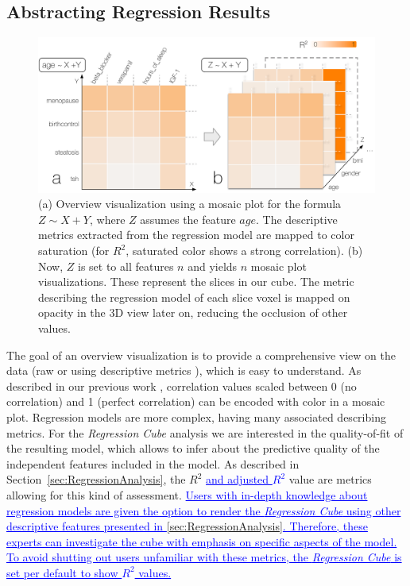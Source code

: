 \documentclass[journal]{style/vgtc} 			          %
\newcommand{\add}[1]{\textcolor{blue}{\uline{#1}}}
\begin{document}
\subsection{Abstracting Regression Results}
\begin{figure}[htb]
 \centering
 \includegraphics[width=1.0\linewidth]{figures/cube}
 \caption{
 (a) Overview visualization using a mosaic plot for the formula $Z \sim X + Y$, where $Z$ assumes the feature $age$.
 The descriptive metrics extracted from the regression model are mapped to color saturation (for $R^2$, saturated color shows a strong correlation).
 (b) Now, $Z$ is set to all features $n$ and yields $n$ mosaic plot visualizations.
 These represent the slices in our cube.
 The metric describing the regression model of each slice voxel is mapped on opacity in the 3D view later on, reducing the occlusion of other values.
 }
  \label{fig:Cube}
\end{figure}
\noindent The goal of an overview visualization is to provide a comprehensive view on the data (raw or using descriptive metrics \cite{Bertini}), which is easy to understand.
As described in our previous work \cite{Klemm2014VIS}, correlation values scaled between 0 (no correlation) and 1 (perfect correlation) can be encoded with color in a mosaic plot.
Regression models are more complex, having many associated describing metrics.
For the \emph{Regression Cube} analysis we are interested in the quality-of-fit of the resulting model, which allows to infer about the predictive quality of the independent features included in the model.
As described in Section~\ref{sec:RegressionAnalysis}, the $R^2$ \add{and adjusted $R^2$} value are metrics allowing for this kind of assessment.
\add{
Users with in-depth knowledge about regression models are given the option to render the \emph{Regression Cube} using other descriptive features presented in \ref{sec:RegressionAnalysis}.
Therefore, these experts can investigate the cube with emphasis on specific aspects of the model.
To avoid shutting out users unfamiliar with these metrics, the \emph{Regression Cube} is set per default to show $R^2$ values.
}
\end{document}
